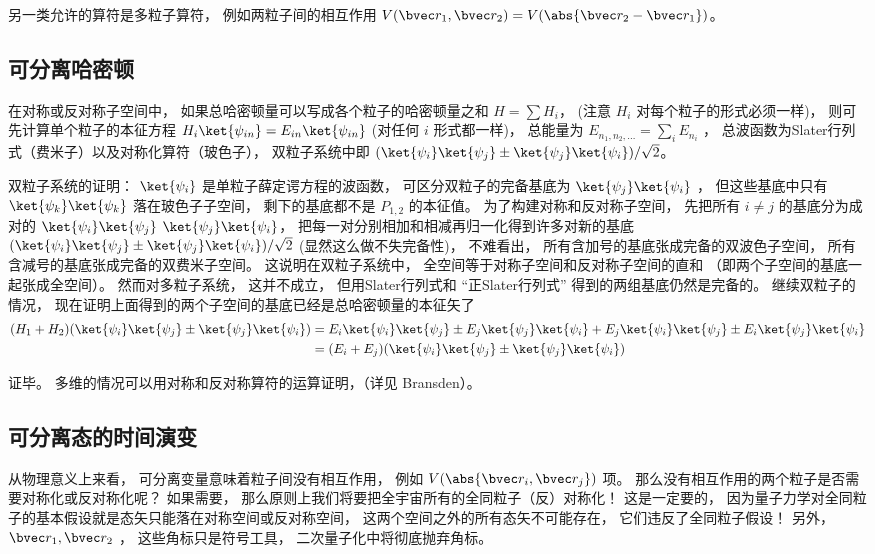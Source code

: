 另一类允许的算符是多粒子算符， 例如两粒子间的相互作用 $V(\bvec r_1, \bvec r_2) = V(\abs{\bvec r_2 - \bvec r_1})$。

\subsection{可分离哈密顿}
在对称或反对称子空间中， 如果总哈密顿量可以写成各个粒子的哈密顿量之和 $H = \sum H_i$， (注意 $H_i$ 对每个粒子的形式必须一样)， 则可先计算单个粒子的本征方程 $H_i \ket{\psi_{in}} = E_{in}\ket{\psi_{in}}$ (对任何 $i$ 形式都一样)， 总能量为 $E_{n_1,n_2,\dots} = \sum_i E_{n_i}$ ， 总波函数为Slater行列式（费米子）以及对称化算符（玻色子）， 双粒子系统中即 $(\ket{\psi_i}\ket{\psi_j} \pm \ket{\psi_j}\ket{\psi_i})/\sqrt{2}$。

双粒子系统的证明： $\ket{\psi_i}$ 是单粒子薛定谔方程的波函数， 可区分双粒子的完备基底为 $\ket{\psi_j}\ket{\psi_i}$ ， 但这些基底中只有 $\ket{\psi_k}\ket{\psi_k}$ 落在玻色子子空间， 剩下的基底都不是 $P_{1,2}$ 的本征值。 为了构建对称和反对称子空间， 先把所有 $i \ne j$ 的基底分为成对的 $\ket{\psi_i}\ket{\psi_j}$ $\ket{\psi_j}\ket{\psi_i}$， 把每一对分别相加和相减再归一化得到许多对新的基底 $(\ket{\psi_i}\ket{\psi_j} \pm \ket{\psi_j}\ket{\psi_i})/\sqrt{2}$ (显然这么做不失完备性)， 不难看出， 所有含加号的基底张成完备的双波色子空间， 所有含减号的基底张成完备的双费米子空间。 这说明在双粒子系统中， 全空间等于对称子空间和反对称子空间的直和 （即两个子空间的基底一起张成全空间）。 然而对多粒子系统， 这并不成立， 但用Slater行列式和 “正Slater行列式” 得到的两组基底仍然是完备的。 继续双粒子的情况， 现在证明上面得到的两个子空间的基底已经是总哈密顿量的本征矢了
\begin{equation}
\begin{aligned}
(H_1 + H_2) (\ket{\psi_i}\ket{\psi_j} \pm \ket{\psi_j}\ket{\psi_i}) &= E_i \ket{\psi_i}\ket{\psi_j} \pm E_j \ket{\psi_j}\ket{\psi_i} + E_j \ket{\psi_i}\ket{\psi_j} \pm E_i \ket{\psi_j}\ket{\psi_i}\\
&= (E_i + E_j) (\ket{\psi_i}\ket{\psi_j} \pm \ket{\psi_j}\ket{\psi_i})
\end{aligned}
\end{equation}

证毕。
多维的情况可以用对称和反对称算符的运算证明，（详见 Bransden）。

\subsection{可分离态的时间演变}
从物理意义上来看， 可分离变量意味着粒子间没有相互作用， 例如 $V(\abs{\bvec r_i, \bvec r_j})$ 项。 那么没有相互作用的两个粒子是否需要对称化或反对称化呢？ 如果需要， 那么原则上我们将要把全宇宙所有的全同粒子（反）对称化！ 这是一定要的， 因为量子力学对全同粒子的基本假设就是态矢只能落在对称空间或反对称空间， 这两个空间之外的所有态矢不可能存在， 它们违反了全同粒子假设！ 另外， $\bvec r_1, \bvec r_2$ ， 这些角标只是符号工具， 二次量子化中将彻底抛弃角标。

